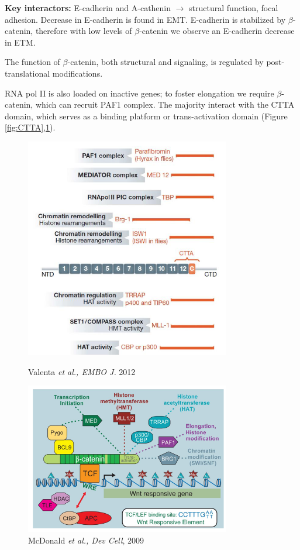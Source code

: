 \textbf{Key interactors:} E-cadherin and A-cathenin $\rightarrow$ structural function, focal adhesion. Decrease in E-cadherin is found in EMT. E-cadherin is stabilized by $\beta$-catenin, therefore with low levels of $\beta$-catenin we observe an E-cadherin decrease in ETM.

The function of $\beta$-catenin, both structural and signaling, is regulated by post-translational modifications.

RNA pol II is also loaded on inactive genes; to foster elongation we require $\beta$-catenin, which can recruit PAF1 complex. The majority interact with the CTTA domain, which serves as a binding platform or trans-activation domain (Figure \ref{fig:CTTA},\ref{fig:domains}).

\begin{figure}[!htb]
   \begin{minipage}{0.48\textwidth}
     \centering
    \includegraphics[width=0.8\textwidth]{../_resources/Screenshot_2022-10-07_at_11-52-13.png}
\caption{Valenta \emph{et al., EMBO J.} 2012}
\label{fig:CTTA}
   \end{minipage}\hfill
   \begin{minipage}{0.48\textwidth}
     \centering
    \includegraphics[width=0.8\textwidth]{../_resources/Screenshot_2022-10-07_at_11-52-58.png}
\caption{McDonald \emph{et al., Dev Cell}, 2009}
\label{fig:domains}
   \end{minipage}
\end{figure}


